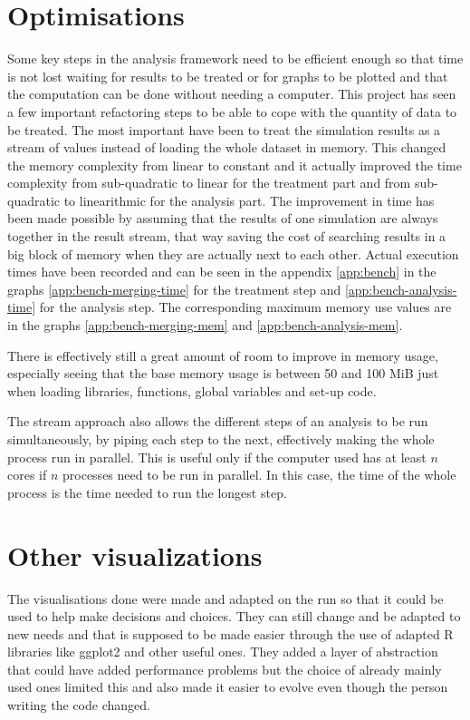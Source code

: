 \documentclass[a4paper,12pt]{report}
\begin{document}
\section{Optimisations}
Some key steps in the analysis framework need to be efficient enough so that time is not lost waiting for results to be treated or for graphs to be plotted and that the computation can be done without needing a computer.
This project has seen a few important refactoring steps to be able to cope with the quantity of data to be treated. The most important have been to treat the simulation results as a stream of values instead of loading the whole dataset in memory. This changed the memory complexity from linear to constant and it actually improved the time complexity from sub-quadratic to linear for the treatment part and from sub-quadratic to linearithmic for the analysis part. The improvement in time has been made possible by assuming that the results of one simulation are always together in the result stream, that way saving the cost of searching results in a big block of memory when they are actually next to each other.
Actual execution times have been recorded and can be seen in the appendix \ref{app:bench} in the graphs \ref{app:bench-merging-time} for the treatment step and \ref{app:bench-analysis-time} for the analysis step. The corresponding maximum memory use values are in the graphs \ref{app:bench-merging-mem} and \ref{app:bench-analysis-mem}.

There is effectively still a great amount of room to improve in memory usage, especially seeing that the base memory usage is between 50 and 100 MiB just when loading libraries, functions, global variables and set-up code.

The stream approach also allows the different steps of an analysis to be run simultaneously, by piping each step to the next, effectively making the whole process run in parallel. This is useful only if the computer used has at least $n$ cores if $n$ processes need to be run in parallel. In this case, the time of the whole process is the time needed to run the longest step.

\section{Other visualizations}
The visualisations done were made and adapted on the run so that it could be used to help make decisions and choices. They can still change and be adapted to new needs and that is supposed to be made easier through the use of adapted R libraries like ggplot2 and other useful ones. They added a layer of abstraction that could have added performance problems but the choice of already mainly used ones limited this and also made it easier to evolve even though the person writing the code changed.
\end{document}
